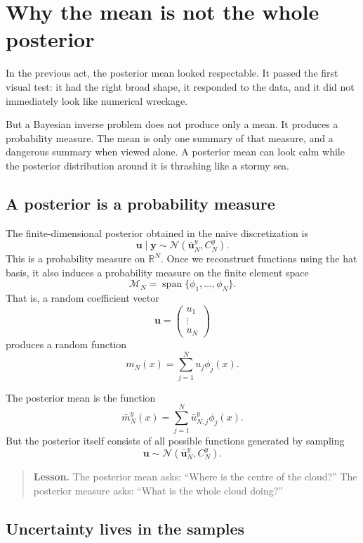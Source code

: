\documentclass[11pt,a4paper]{book}
\newenvironment{lesson}
  {\begin{quote}\textbf{Lesson.}}
  {\end{quote}}
\newcommand{\M}{\mathcal{M}}      %
\begin{document}
\section{Why the mean is not the whole posterior}

In the previous act, the posterior mean looked respectable. It passed the first
visual test: it had the right broad shape, it responded to the data, and it did
not immediately look like numerical wreckage.

But a Bayesian inverse problem does not produce only a mean. It produces a
probability measure. The mean is only one summary of that measure, and a
dangerous summary when viewed alone. A posterior mean can look calm while the
posterior distribution around it is thrashing like a stormy sea.

\subsection{A posterior is a probability measure}

The finite-dimensional posterior obtained in the naive discretization is
\[
    \bm{u}\mid \bm{y}
    \sim
    \mathcal{N}(\bar{\bm{u}}_N^y,C_N^y).
\]
This is a probability measure on $\mathbb{R}^N$. Once we reconstruct functions
using the hat basis, it also induces a probability measure on the finite element
space
\[
    \M_N = \operatorname{span}\{\phi_1,\ldots,\phi_N\}.
\]
That is, a random coefficient vector
\[
    \bm{u}
    =
    \begin{pmatrix}
        u_1\\
        \vdots\\
        u_N
    \end{pmatrix}
\]
produces a random function
\[
    m_N(x)
    =
    \sum_{j=1}^N u_j\phi_j(x).
\]

The posterior mean is the function
\[
    \bar{m}_N^y(x)
    =
    \sum_{j=1}^N \bar{u}_{N,j}^y\phi_j(x).
\]
But the posterior itself consists of all possible functions generated by
sampling
\[
    \bm{u} \sim \mathcal{N}(\bar{\bm{u}}_N^y,C_N^y).
\]

\begin{lesson}
The posterior mean asks: ``Where is the centre of the cloud?''
The posterior measure asks: ``What is the whole cloud doing?''
\end{lesson}

\subsection{Uncertainty lives in the samples}
\end{document}

